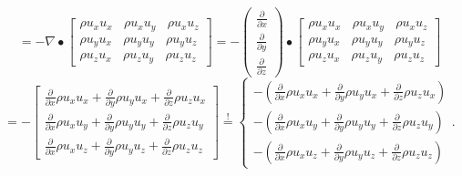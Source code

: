 \documentclass[LBMDerivation.tex]{subfiles}
\begin{document}
%
%
%
\begin{equation*}
= -   \nabla \bullet
  \left[
  \begin{matrix}
    \rho u_x u_x ~~~~ \rho u_x u_y ~~~~ \rho u_x u_z \\
    \rho u_y u_x ~~~~ \rho u_y u_y ~~~~ \rho u_y u_z \\
    \rho u_z u_x ~~~~ \rho u_z u_y ~~~~ \rho u_z u_z
  \end{matrix}
  \right]
=
- \left(
  \begin{matrix}
    \frac{\partial}{\partial x} \\
    \frac{\partial}{\partial y} \\
    \frac{\partial}{\partial z}
  \end{matrix}
  \right)
  \bullet
  \left[
  \begin{matrix}
    \rho u_x u_x ~~~~ \rho u_x u_y ~~~~ \rho u_x u_z \\
    \rho u_y u_x ~~~~ \rho u_y u_y ~~~~ \rho u_y u_z \\
    \rho u_z u_x ~~~~ \rho u_z u_y ~~~~ \rho u_z u_z
  \end{matrix}
  \right]
\end{equation*}
%
%
\begin{equation*}
= - \left[
  \begin{matrix}
    \frac{\partial}{\partial x} \rho u_x u_x +
    \frac{\partial}{\partial y} \rho u_y u_x +
    \frac{\partial}{\partial z} \rho u_z u_x \\
    \frac{\partial}{\partial x} \rho u_x u_y +
    \frac{\partial}{\partial y} \rho u_y u_y +
    \frac{\partial}{\partial z} \rho u_z u_y \\
    \frac{\partial}{\partial x} \rho u_x u_z +
    \frac{\partial}{\partial y} \rho u_y u_z +
    \frac{\partial}{\partial z} \rho u_z u_z
  \end{matrix}
  \right]
\overset{!}{=}
\begin{cases}
  -\left(
      \frac{\partial}{\partial x} \rho u_x u_x
      +\frac{\partial}{\partial y} \rho u_y u_x
      +\frac{\partial}{\partial z} \rho u_z u_x
  \right)%
  \\
  -\left(
      \frac{\partial}{\partial x} \rho u_x u_y
      +\frac{\partial}{\partial y} \rho u_y u_y
      +\frac{\partial}{\partial z} \rho u_z u_y
  \right)%
  \\
  -\left(
      \frac{\partial}{\partial x} \rho u_x u_z
      +\frac{\partial}{\partial y} \rho u_y u_z
      +\frac{\partial}{\partial z} \rho u_z u_z
  \right)%
\end{cases}
  .
\end{equation*}
\end{document}

